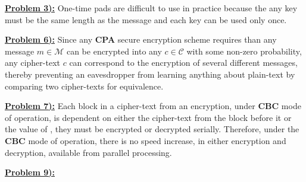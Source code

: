 \documentclass{article}[12]
\numberwithin{equation}{section}
\newcommand{\numbpr}[1]{\setcounter{section}{#1} \setcounter{equation}{0}}
\newcommand{\prob}[1]{\textbf{\underline{Problem #1):}}}
\begin{document}
\begin{flushleft}





\vspace{0.25 in}





\vspace{0.25in}


\numbpr{3}
\prob{3} One-time pads are difficult to use in practice because the any key must be the same length as the message and each key can be used only once. \newline


\vspace{0.25in}





\vspace{0.25in}





\vspace{0.25in}


\numbpr{6} 
\prob{6} Since any \textbf{CPA} secure encryption scheme requires than any message $m \in \mathcal{M}$ can be encrypted into any $c \in \mathcal{C}$ with some non-zero probability, any cipher-text $c$ can correspond to the encryption of several different messages, thereby preventing an eavesdropper from learning anything about plain-text by comparing two cipher-texts for equivalence. \newline


\vspace{0.25in}


\numbpr{7}
\prob{7} Each block in a cipher-text from an encryption, under \textbf{CBC} mode of operation, is dependent on either the cipher-text from the block before it or the value of , they must be encrypted or decrypted serially.  Therefore, under the \textbf{CBC} mode of operation, there is no speed increase, in either encryption and decryption, available from parallel processing. \newline


\vspace{0.25in}





\vspace{0.25in}


\numbpr{9}
\prob{9}  







\end{flushleft}
\end{document}
